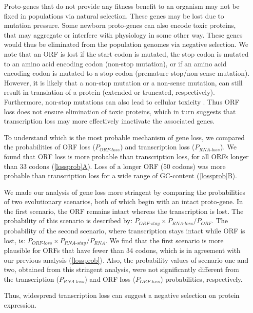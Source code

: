\documentclass[12pt,a4paper]{article}
\begin{document}
Proto-genes that do not provide any fitness benefit to an organism may not be fixed in populations via natural selection. These genes may be lost due to mutation pressure. Some newborn proto-genes can also encode toxic proteins, that may aggregate or interfere with physiology in some other way. These genes would thus be eliminated from the population genomes via negative selection. We note that an ORF is lost if the start codon is mutated, the stop codon is mutated to an amino acid encoding codon (non-stop mutation), or if an amino acid encoding codon is mutated to a stop codon (premature stop/non-sense mutation). However, it is likely that a non-stop mutation or a non-sense mutation, can still result in translation of a protein (extended or truncated, respectively). Furthermore, non-stop mutations can also lead to cellular toxicity \citep{nonstop}. Thus ORF loss does not ensure elimination of toxic proteins, which in turn suggests that transcription loss may more effectively inactivate the associated genes.

To understand which is the most probable mechanism of gene loss, we compared the probabilities of ORF loss ($P_\textit{ORF-loss}$) and transcription loss ($P_\textit{RNA-loss}$). We found that ORF loss is more probable than transcription loss, for all ORFs longer than 33 codons (\hyperref[lossprob]{\autoref{lossprob}A}). Loss of a longer ORF (50 codons) was more probable than transcription loss for a wide range of GC-content (\hyperref[lossprob]{\autoref{lossprob}B}).

We made our analysis of gene loss more stringent by comparing the probabilities of two evolutionary scenarios, both of which begin with an intact proto-gene. In the first scenario, the ORF remains intact whereas the transcription is lost. The probability of this scenario is described by: 
$P_\textit{ORF-stay} \times P_\textit{RNA-loss}/P_\textit{ORF}$. The probability of the second scenario, where transcription stays intact while ORF is lost, is: $P_\textit{ORF-loss} \times P_\textit{RNA-stay}/P_\textit{RNA}$. We find that the first scenario is more plausible for ORFs that have fewer than 34 codons, which is in agreement with our previous analysis (\autoref{lossprob}). Also, the probability values of scenario one and two, obtained from this stringent analysis, were not significantly different from the transcription ($P_\textit{RNA-loss}$) and ORF loss ($P_\textit{ORF-loss}$) probabilities, respectively. 

Thus, widespread transcription loss can suggest a negative selection on protein expression.
\end{document}
